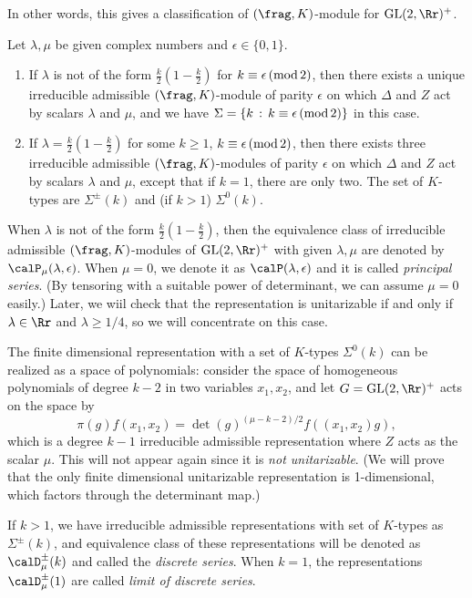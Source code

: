 In other words, this gives a classification of $(\frag, K)$-module for $\GL(2, \Rr)^{+}$. 
\begin{theorem}
Let $\lambda, \mu$ be given complex numbers and $\epsilon \in \{0, 1\}$. 
\begin{enumerate}
\item If $\lambda$ is not of the form $\frac{k}{2}\left( 1- \frac{k}{2}\right)$ for $k\equiv \epsilon \,(\mathrm{mod}\,2)$, then there exists a unique irreducible admissible $(\frag, K)$-module of parity $\epsilon$ on which $\Delta$ and $Z$ act by scalars $\lambda$ and $\mu$, and we have $\Sigma = \{k\,:\, k\equiv \epsilon\,(\mathrm{mod}\,2)\}$ in this case. 
\item If $\lambda = \frac{k}{2}\left( 1 - \frac{k}{2} \right)$ for some $k\geq 1$, $k\equiv \epsilon\,(\mathrm{mod}\,2)$, then there exists three irreducible admissible  $(\frag, K)$-modules of parity $\epsilon$ on which $\Delta$ and $Z$ act by scalars $\lambda$ and $\mu$, except that if $k = 1$, there are only two. 
The set of $K$-types are $\Sigma ^{\pm}(k)$ and (if $k>1$) $\Sigma^{0}(k)$. 
\end{enumerate}
\end{theorem}
When $\lambda$ is not of the form $\frac{k}{2}\left(1-\frac{k}{2}\right)$, then the equivalence class of irreducible admissible $(\frag, K)$-modules of $\GL(2, \Rr)^{+}$ with given $\lambda, \mu$ are denoted by $\calP_{\mu}(\lambda, \epsilon)$. When $\mu = 0$, we denote it as $\calP(\lambda, \epsilon)$ and it is called \emph{principal series}. (By tensoring with a suitable power of determinant, we can assume $\mu = 0$ easily.) Later, we wiil check that the representation is unitarizable if and only if $\lambda\in \Rr$ and $\lambda \geq 1/4$, so we will concentrate on this case. 

The finite dimensional representation with a set of $K$-types $\Sigma^{0}(k)$ can be realized as a space of polynomials: consider the space of homogeneous polynomials of degree $k-2$ in two variables $x_{1}, x_{2}$, and let $G = \GL(2, \Rr)^{+}$ acts on the space by 
$$
\pi(g)f(x_{1}, x_{2}) = \det(g)^{(\mu-k-2)/2} f((x_{1}, x_{2})g),
$$
which is a degree $k-1$ irreducible admissible representation where $Z$ acts as the scalar $\mu$. 
This will not appear again since it is \emph{not unitarizable}. (We will prove that the only finite dimensional unitarizable representation is 1-dimensional, which factors through the determinant map.)

If $k>1$, we have irreducible admissible representations with set of $K$-types as $\Sigma^{\pm}(k)$, and equivalence class of these representations will be denoted as $\calD^{\pm}_{\mu}(k)$ and called the \emph{discrete series}. When $k = 1$, the representations $\calD_{\mu}^{\pm}(1)$ are called \emph{limit of discrete series}. 


